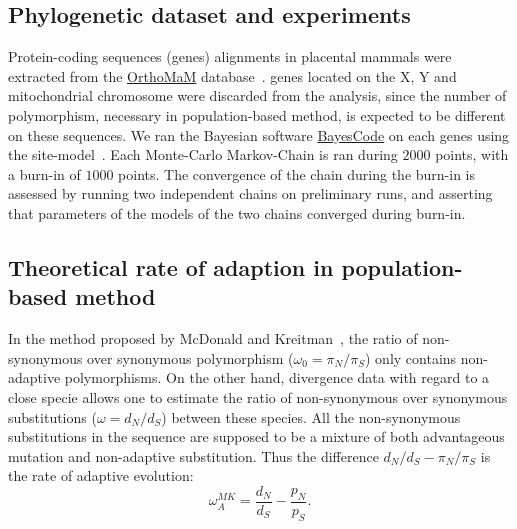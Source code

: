 \documentclass{article}
\newcommand{\dn}{d_N}
\newcommand{\ds}{d_S}
\newcommand{\dnds}{\dn / \ds}
\newcommand{\pn}{\pi_N}
\newcommand{\ps}{\pi_S}
\newcommand{\pnps}{\pn / \ps}
\begin{document}
\subsection*{Phylogenetic dataset and experiments}
Protein-coding sequences (genes) alignments in placental mammals were extracted from the \href{http://www.orthomam.univ-montp2.fr}{OrthoMaM} database~\citep{ranwez_orthomam_2007, douzery_orthomam_2014, scornavacca_orthomam_2019}.
genes located on the X, Y and mitochondrial chromosome were discarded from the analysis, since the number of polymorphism, necessary in population-based method, is expected to be different on these sequences.
We ran the Bayesian software \href{https://github.com/bayesiancook/bayescode}{BayesCode} on each genes using the site-model~\citep{lartillot_phylobayes_2013, rodrigue_detecting_2016}.
Each Monte-Carlo Markov-Chain is ran during $2000$ points, with a burn-in of $1000$ points.
The convergence of the chain during the burn-in is assessed by running two independent chains on preliminary runs, and asserting that parameters of the models of the two chains converged during burn-in.

\subsection*{Theoretical rate of adaption in population-based method}
In the method proposed by McDonald and Kreitman~\citep{mcdonald_adaptative_1991}, the ratio of non-synonymous over synonymous polymorphism ($\omega_{0}=\pnps$) only contains non-adaptive polymorphisms.
On the other hand, divergence data with regard to a close specie allows one to estimate the ratio of non-synonymous over synonymous substitutions ($\omega=\dnds$) between these species.
All the non-synonymous substitutions in the sequence are supposed to be a mixture of both advantageous mutation and non-adaptive substitution.
Thus the difference $\dnds - \pnps$ is the rate of adaptive evolution:
\begin{equation*}
	\omega_A^{MK}=\dfrac{d_N}{d_S} - \dfrac{p_N}{p_S}.
\end{equation*}
\end{document}
